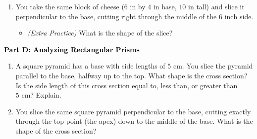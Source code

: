 \documentclass[12pt, letterpaper, fleqn]{article}
\newcommand{\blank}{\underline{\hspace{2.2cm}}}
\begin{document}
\begin{enumerate}[itemsep=4.2cm, leftmargin=0.6cm, resume]
\item You take the same block of cheese ($6\text{ in}$ by $4\text{ in}$ base, $10\text{ in}$ tall) and slice it perpendicular to the base, cutting right through the middle of the $6\text{ inch}$ side.
\begin{itemize}
\item \textit{(Extra Practice)} What is the shape of the slice? \blank
\end{itemize}
\end{enumerate}

\newpage

\begin{tcolorbox}[colback=customteal!20]
\large\textcolor{black}{\textbf{Part D: Analyzing Rectangular Prisms}}
\end{tcolorbox}

\vspace{3mm}

\begin{enumerate}[itemsep=4.2cm, leftmargin=0.6cm, resume]
\begin{itemize}
\item What are the dimensions of the slice? \blank
\end{itemize}
\item A square pyramid has a base with side lengths of $5\text{ cm}$. You slice the pyramid parallel to the base, halfway up to the top. What shape is the cross section? Is the side length of this cross section equal to, less than, or greater than $5\text{ cm}$? Explain.
\item You slice the same square pyramid perpendicular to the base, cutting exactly through the top point (the apex) down to the middle of the base. What is the shape of the cross section?
\end{enumerate}
\end{document}
